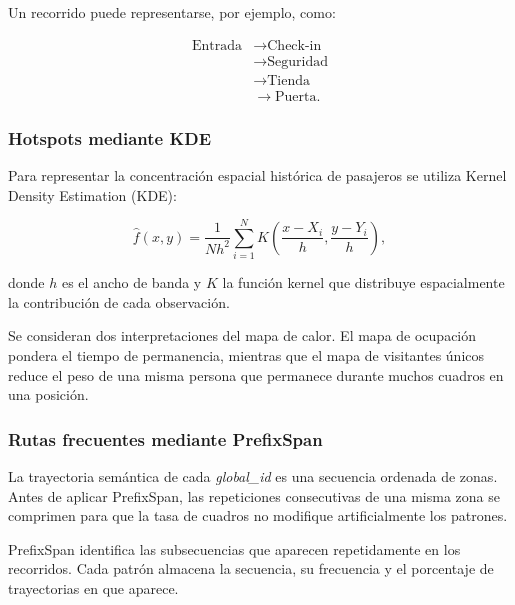 \documentclass[12pt,letterpaper]{article}
\begin{document}
Un recorrido puede representarse, por ejemplo, como:

\begin{equation}
\begin{aligned}
\text{Entrada}
&\rightarrow \text{Check-in}\\
&\rightarrow \text{Seguridad}\\
&\rightarrow \text{Tienda}\\
&\rightarrow \text{Puerta}.
\end{aligned}
\end{equation}

\subsubsection{Hotspots mediante KDE}

Para representar la concentración espacial histórica de pasajeros se
utiliza Kernel Density Estimation (KDE):

\begin{equation}
\hat{f}(x,y)
=
\frac{1}{Nh^2}
\sum_{i=1}^{N}
K
\left(
\frac{x-X_i}{h},
\frac{y-Y_i}{h}
\right),
\end{equation}

donde $h$ es el ancho de banda y $K$ la función kernel que distribuye
espacialmente la contribución de cada observación.

Se consideran dos interpretaciones del mapa de calor. El mapa de
ocupación pondera el tiempo de permanencia, mientras que el mapa de
visitantes únicos reduce el peso de una misma persona que permanece
durante muchos cuadros en una posición.

\subsubsection{Rutas frecuentes mediante PrefixSpan}

La trayectoria semántica de cada \textit{global\_id} es una secuencia
ordenada de zonas. Antes de aplicar PrefixSpan, las repeticiones
consecutivas de una misma zona se comprimen para que la tasa de cuadros
no modifique artificialmente los patrones.

PrefixSpan identifica las subsecuencias que aparecen repetidamente en los
recorridos. Cada patrón almacena la secuencia, su frecuencia y el
porcentaje de trayectorias en que aparece.

\end{document}
